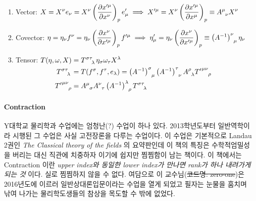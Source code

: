 \documentclass[final]{IEEEphot} %
\numberwithin{equation}{section} %
\numberwithin{figure}{section} %
\numberwithin{table}{section} %
\theoremstyle{plain}
\newcommand{\Hs}{\hspace{0.1cm}}
\newcommand{\PD}[2]{\frac{\partial #1}{\partial #2}}
\newcommand{\BKS}[1]{\left( #1 \right)}
\begin{document}
\begin{enumerate}
 \item Vector: \Hs $\begin{aligned}[t]
                     X = X^{\nu}e_{\nu} = X^{\nu} \BKS{\PD{x'^{\mu}}{x^{\nu}}}_p e'_\mu \Hs \Longrightarrow \Hs X'^{\mu} = X^{\nu}\BKS{\PD{x'^{\mu}}{x^{\mu}}}_p \equiv \tensor{A}{^\mu _\nu}X^{\nu}
                    \end{aligned}$
 \item Covector: \Hs $\begin{aligned}[t]
                       \eta = \eta_{\nu} f^{\nu} = \eta_{\nu} \BKS{\PD{x^{\nu}}{x'^{\mu}}}_p f'^{\mu} \Hs \Longrightarrow \Hs \eta'_{\mu} = \eta_{\nu} \BKS{\PD{x^{\nu}}{x'^{\mu}}}_p \equiv \tensor{\BKS{A^{-1}}}{^\nu _\mu}\eta_{\nu}
                      \end{aligned}$
 \item Tensor: \Hs $\begin{aligned}[t]
                     T(\eta,\omega,X) & = \tensor{T}{^\sigma^\tau_\lambda} \eta_\sigma \omega_{\tau} X^{\lambda}\\
                     \tensor{T}{^\sigma ^\tau _\lambda} & = T(f^\sigma, f^\tau,e_\lambda) = \tensor{\BKS{A^{-1}}}{^\sigma _\mu} \tensor{\BKS{A^{-1}}}{^\tau _\nu} \tensor{A}{^\rho _\lambda} \tensor{{T'}}{ ^\mu ^\nu _\rho} \\
                     \tensor{{T'}}{^\mu ^\nu _\rho} & = \tensor{A}{^\mu _\sigma} \tensor{A}{^\nu _\tau} \tensor{\BKS{A^{-1}}}{^\lambda _\rho} \tensor{T}{^\sigma^\tau_\lambda} 
                    \end{aligned}$


\end{enumerate}


\paragraph{ Contraction}

Y대학교 물리학과 수업에는 엄청난(?) 수업이 하나 있다. 2013학년도부터 일반역학이라 시행된 그 수업은 사실 고전장론을 다루는 수업이다.\footnotemark
{}
이 수업은 기본적으로 Landau 2권인 \emph{The Classical theory of the fields} 의 요약판인데 이 책의 특징은 수학적엄밀성을 버리는 대신 직관에 치중하자 이기에 
쉽지만 찜찜함이 남는 책이다. 이 책에서는 Contraction 이란 \textit{upper index와 동일한 lower index가 만나면 rank가 하나 내려가게 되는 것} 이다. 실로 찜찜하지 않을 수 없다.
여담으로 이 교수님(\sout{코드명: zero-one})은 2016년도에 이르러 일반상대론입문이라는 수업을 열게 되었고 필자는 눈물을 훔치며 낚여 나가는 물리학도생들의 참상을 목도할 수 밖에 없었다. \footnotemark 
{}
\end{document}

